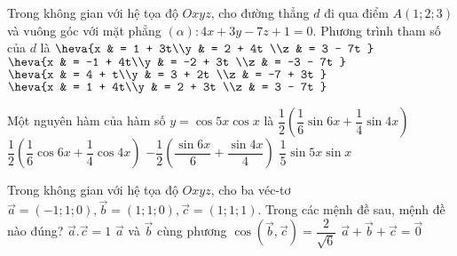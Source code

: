 \begin{ex}%
Trong không gian với hệ tọa độ $Oxyz$, cho đường thẳng $d$ đi qua điểm $A(1; 2; 3)$ và vuông góc với mặt phẳng $(\alpha): 4x + 3y - 7z + 1 = 0$. Phương trình tham số của $d$ là 
\choice
{$\heva{x & = 1 + 3t\\y & = 2 + 4t \\z & = 3 - 7t }$}
{$\heva{x & = -1 + 4t\\y & = -2 + 3t \\z & = -3 - 7t }$}
{$\heva{x & = 4 + t\\y & = 3 + 2t \\z & = -7 + 3t }$}
{\True $\heva{x & = 1 + 4t\\y & = 2 + 3t \\z & = 3 - 7t }$}
\end{ex}





\begin{ex}%
Một nguyên hàm của hàm số $y = \cos 5x \cos x$ là
\choice
{\True $\dfrac{1}{2} \left(\dfrac{1}{6} \sin 6x + \dfrac{1}{4} \sin 4x \right)$}
{$\dfrac{1}{2} \left(\dfrac{1}{6} \cos 6x + \dfrac{1}{4} \cos 4x \right)$}
{$-\dfrac{1}{2} \left(\dfrac{\sin 6x}{6} + \dfrac{\sin4x}{4}\right)$}
{$\dfrac{1}{5} \sin 5x \sin x$}
\end{ex}




\begin{ex}%
Trong không gian với hệ tọa độ $Oxyz$, cho ba véc-tơ $\overrightarrow{a} = (-1; 1; 0), \overrightarrow{b}= (1; 1; 0), \overrightarrow{c} = (1; 1; 1)$. Trong các mệnh đề sau, mệnh đề nào đúng?
\choice
{$\overrightarrow{a} . \overrightarrow{c} = 1$}
{$\overrightarrow{a}$ và $\overrightarrow{b}$ cùng phương}
{\True $\cos \left(\overrightarrow{b}, \overrightarrow{c} \right) = \dfrac{2}{\sqrt{6}}$}
{$\overrightarrow{a} + \overrightarrow{b} + \overrightarrow{c} = \overrightarrow{0}$}
\end{ex}





